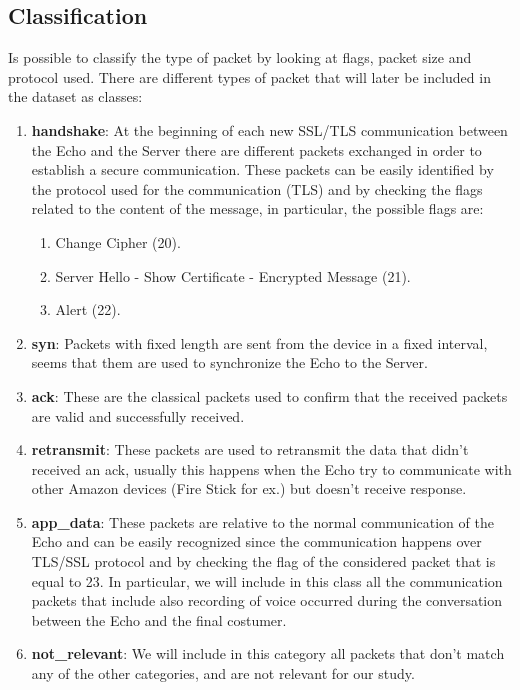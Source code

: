 \documentclass[sigconf]{acmart}
\begin{document}
    \subsection{Classification}
    Is possible to classify the type of packet by looking at flags, packet size and protocol used.
    There are different types of packet that will later be included in the dataset as classes:
    \begin{enumerate}
        \item \textbf{handshake}: At the beginning of each new SSL/TLS communication between the Echo and the Server there are different packets exchanged in order to establish a secure communication.
        These packets can be easily identified by the protocol used for the communication (TLS) and by checking the flags related to the content of the message, in particular, the possible flags are:
        \begin{enumerate}
            \item Change Cipher (20).
            \item Server Hello - Show Certificate - Encrypted Message (21).
            \item Alert (22).
        \end{enumerate}
        \item \textbf{syn}: Packets with fixed length are sent from the device in a fixed interval, seems that them are used to synchronize the Echo to the Server.
        \item \textbf{ack}: These are the classical packets used to confirm that the received packets are valid and successfully received.
        \item \textbf{retransmit}: These packets are used to retransmit the data that didn't received an ack, usually this happens when the Echo try to communicate with other Amazon devices (Fire Stick for ex.) but doesn't receive response.
        \item \textbf{app\_data}: These packets are relative to the normal communication of the Echo and can be easily recognized since the communication happens over TLS/SSL protocol and by checking the flag of the considered packet that is equal to 23.
        In particular, we will include in this class all the communication packets that include also recording of voice occurred during the conversation between the Echo and the final costumer.
        \item \textbf{not\_relevant}: We will include in this category all packets that don't match any of the other categories, and are not relevant for our study.
    \end{enumerate}
\end{document}

